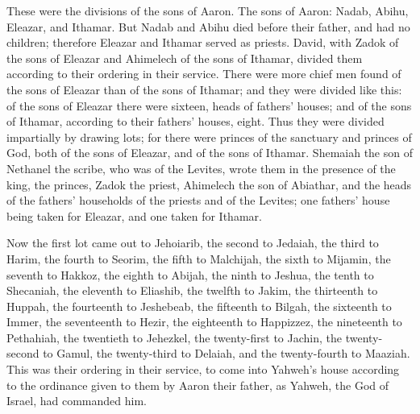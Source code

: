  These were the divisions of the sons of Aaron. The sons
of Aaron: Nadab, Abihu, Eleazar, and Ithamar.  But Nadab
and Abihu died before their father, and had no children; therefore
Eleazar and Ithamar served as priests.  David, with Zadok
of the sons of Eleazar and Ahimelech of the sons of Ithamar, divided
them according to their ordering in their service.  There
were more chief men found of the sons of Eleazar than of the sons of
Ithamar; and they were divided like this: of the sons of Eleazar there
were sixteen, heads of fathers' houses; and of the sons of Ithamar,
according to their fathers' houses, eight.  Thus they were
divided impartially by drawing lots; for there were princes of the
sanctuary and princes of God, both of the sons of Eleazar, and of the
sons of Ithamar.  Shemaiah the son of Nethanel the scribe,
who was of the Levites, wrote them in the presence of the king, the
princes, Zadok the priest, Ahimelech the son of Abiathar, and the heads
of the fathers' households of the priests and of the Levites; one
fathers' house being taken for Eleazar, and one taken for Ithamar.

 Now the first lot came out to Jehoiarib, the second to
Jedaiah,  the third to Harim, the fourth to Seorim,
 the fifth to Malchijah, the sixth to Mijamin,
 the seventh to Hakkoz, the eighth to Abijah,
 the ninth to Jeshua, the tenth to Shecaniah,
 the eleventh to Eliashib, the twelfth to Jakim,
 the thirteenth to Huppah, the fourteenth to Jeshebeab,
 the fifteenth to Bilgah, the sixteenth to Immer,
 the seventeenth to Hezir, the eighteenth to Happizzez,
 the nineteenth to Pethahiah, the twentieth to Jehezkel,
 the twenty-first to Jachin, the twenty-second to Gamul,
 the twenty-third to Delaiah, and the twenty-fourth to
Maaziah.  This was their ordering in their service, to
come into Yahweh's house according to the ordinance given to them by
Aaron their father, as Yahweh, the God of Israel, had commanded him.

